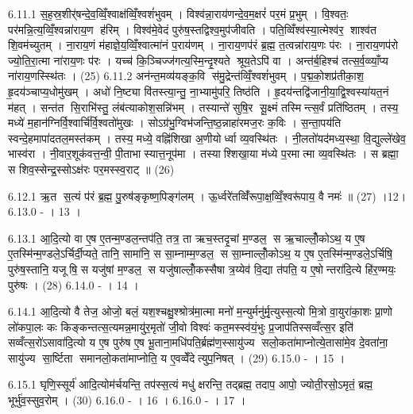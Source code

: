 6.11.1
स॒ह॒स्र॒शीर्॑षन्दे॒व॒व्विँ॒श्वाक्ष॑व्विँ॒श्वशं॑भुवम् । विश्व॑न्ना॒राय॑णन्दे॒व॒म॒क्षरं॑ पर॒मं प्र॒भुम् । वि॒श्वतः॒ पर॑मन्नि॒त्य॒व्विँ॒श्वन्ना॑राय॒ण ह॑रिम् । विश्व॑मे॒वेदं पुरु॑ष॒स्तद्विश्व॒मुप॑जीवति । पति॒व्विँश्व॑स्या॒त्मेश्व॑र॒ शाश्व॑त शि॒वम॑च्युतम् । ना॒राय॒णं म॑हाज्ञे॒य॒व्विँ॒श्वात्मा॑नं प॒राय॑णम् । ना॒राय॒णप॑रं ब्र॒ह्म॒ त॒त्वन्ना॑राय॒णः प॑रः । ना॒राय॒णप॑रो ज्यो॒ति॒रा॒त्मा ना॑राय॒णः प॑रः । यच्च॑ कि॒ञ्चिज्ज॑गत्य॒स्मि॒न्दृ॒श्यते श्रूय॒तेऽपि॑ वा । अन्त॑र्ब॒हिश्च॑ तत्स॒र्व॒व्व्याँ॒प्य ना॑राय॒णस्स्थि॑तः । (25)
6.11.2
अन॑न्त॒मव्य॑यङ्क॒वि स॑मु॒द्रेन्त॑व्विँ॒श्वशं॑भुवम् । प॒द्म॒को॒शप्र॑तीका॒श॒ हृ॒दय॑ञ्चाप्य॒धोमु॑खम् । अधो॑ नि॒ष्ट्या वि॑तस्त्या॒न्तु॒ ना॒भ्यामु॑परि॒ तिष्ठ॑ति । हृ॒दय॑न्तद्वि॑जानी॒या॒द्वि॒श्वस्या॑यत॒नं म॑हत् । सन्त॑त सि॒राभि॑स्तु॒ लंब॑त्याकोश॒सन्नि॑भम् । तस्यान्ते॑ सुषि॒र सू॒क्ष्मं तस्मिन्त्स॒र्वं प्रति॑ष्ठितम् । तस्य॒ मध्ये॑ म॒हान॑ग्निर्वि॒श्वार्चि॑र्वि॒श्वतो॑मुखः । सोऽग्र॑भु॒ग्विभ॑जन्ति॒ष्ठ॒न्नाहा॑रमज॒रः क॒विः । स॒न्ता॒पय॑ति स्वन्दे॒हमापा॑दतल॒मस्त॑कम् । तस्य॒ मध्ये॒ वह्नि॑शिखा अ॒णीयोर्ध्वा व्य॒वस्थि॑तः । नी॒लतो॑यद॑मध्य॒स्था॒ वि॒द्युल्ले॑खेव॒ भास्व॑रा । नी॒वार॒शूक॑वत्त॒न्वी॒ पी॒ताभास्यात्त॒नूप॑मा । तस्याश्शिखा॒या म॑ध्ये प॒रमात्मा व्य॒वस्थि॑तः । स ब्रह्मा॒ स शिव॒स्सेन्द्र॒स्सोऽक्ष॑रः पर॒मस्स्व॒राट् ॥ (26)
\anuvakamend

6.12.1
ऋ॒त स॒त्यं प॑रं ब्र॒ह्म॒ पु॒रुष॑ङ्कृष्ण॒पिङ्ग॑लम् । ऊ॒र्ध्वरे॑तव्विँ॑रूपा॒क्ष॒व्विँ॒श्वरू॑पाय॒ वै नमः॑ ॥ (27) ।12।
6.13.0
- । 13 ।
\anuvakamend

6.13.1
आ॒दि॒त्यो वा ए॒ष ए॒तन्म॒ण्डल॒न्तप॑ति॒ तत्र॒ ता ऋच॒स्तदृ॒चां म॒ण्डल॒ स ऋ॒चाल्लोँ॒कोऽथ॒ य ए॒ष ए॒तस्मि॑न्म॒ण्डले॒ऽर्चिर्दी॒प्यते॒ तानि॒ सामा॑नि॒ स सा॒म्नाम्म॒ण्डल॒ स सा॒म्नाल्लोँ॒कोऽथ॒ य ए॒ष ए॒तस्मि॑न्म॒ण्डले॒ऽर्चिषि॒ पुरु॑ष॒स्तानि॒ यजूषि॒ स यजु॑षां म॒ण्डल॒ स यजु॑षाल्लोँ॒कस्सैषा त्र॒य्येव॑ वि॒द्या त॑पति॒ य ए॒षोन्तरा॑दि॒त्ये हि॑र॒ण्मयः॒ पुरु॑षः । (28)
6.14.0
- । 14 ।
\anuvakamend

6.14.1
आ॒दि॒त्यो वै तेज॒ ओजो॒ बलं॒ यश॒श्चक्षु॒श्श्रोत्र॑मा॒त्मा मनो॑ म॒न्युर्मनु॑र्मृ॒त्युस्स॒त्यो मि॒त्रो वा॒युरा॑का॒शः प्रा॒णो लो॑कपा॒लः कः किङ्कन्तत्स॒त्यमन्न॒मायु॑र॒मृतो॑ जी॒वो विश्वः॑ कत॒मस्स्व॑यं॒भुः प्र॒जाप॑तिस्सव्वँत्स॒र इति॑ सव्वँत्स॒रो॑ऽसावा॑दि॒त्यो य ए॒ष पुरु॑ष ए॒ष भू॒ताना॒मधि॑पति॒र्ब्रह्म॑ण॒स्सायु॑ज्य सलो॒कता॑माप्नोत्ये॒तासा॑मे॒व दे॒वता॑ना॒ सायु॑ज्य सा॒र्ष्टिता समानलो॒कता॑माप्नोति॒ य ए॒वव्वेँदेत्युप॒निषत् । (29)
6.15.0
- । 15 ।
\anuvakamend

6.15.1
घृणि॒स्सूर्य॑ आदि॒त्योम॑र्चयन्ति॒ तप॑स्स॒त्यं मधु॑ क्षरन्ति॒ तद्ब्रह्म॒ तदाप॒ आपो॒ ज्योती॒रसो॒ऽमृतं॒ ब्रह्म॒ भूर्भु॑व॒स्सुव॒रोम् । (30)
6.16.0
- । 16 ।
6.16.0
- । 17 ।
\anuvakamend

